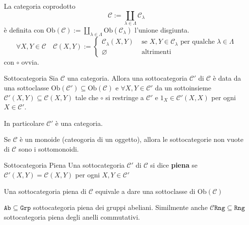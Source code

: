 \begin{example}
    La categoria coprodotto
    \[
      \mathcal{C} := \coprod_{\lambda \in \Lambda} \mathcal{C}_{\lambda} 
    \]
    è definita con \(\mathrm{Ob}{(\mathcal{C})} := \coprod_{\lambda \in \Lambda} \mathrm{Ob}{(\mathcal{C}_{\lambda} )}\) l'unione disgiunta. 
    \[
      \forall X, Y \in \mathcal{C} \quad \mathcal{C}{(X, Y)} := \begin{cases}{}
          \mathcal{C}_{\lambda} {(X, Y)} & \text{ se } X, Y \in \mathcal{C}_{\lambda} \text{ per
          qualche } \lambda \in \Lambda \\
              \varnothing & \text{ altrimenti}
      \end{cases}
    \]
    con \(\circ\) ovvia.
\end{example}

\begin{definition}{Sottocategoria}
    Sia \(\mathcal{C}\) una categoria. Allora una sottocategoria \(\mathcal{C}'\) di \(\mathcal{C}\) è data
    da una sottoclasse \(\mathrm{Ob}{(\mathcal{C}')} \subseteq \mathrm{Ob}{(\mathcal{C})} \) e \(\forall X, Y \in \mathcal{C}'\) da un sottoinsieme \(\mathcal{C}'{(X, Y)} \subseteq \mathcal{C}{(X, Y)} \) tale che \(\circ\) si restringe a \(\mathcal{C}'\) e \(1_X \in \mathcal{C}'{(X, X)}\) per ogni \(X \in \mathcal{C}'\).

    In particolare \(\mathcal{C}'\) è una categoria.
\end{definition}

\begin{example}{}
    Se \(\mathcal{C}\) è un monoide (cateogoria di un oggetto), allora le sottocategorie
    non vuote di \(\mathcal{C}\) sono i sottomonoidi.
\end{example}

\begin{definition}{Sottocategoria Piena}
    Una sottocategoria \(\mathcal{C}'\) di \(\mathcal{C}\) si dice \textbf{piena} se \(\mathcal{C}'{(X, Y)} =
    \mathcal{C}{(X, Y)}\) per ogni \(X, Y \in \mathcal{C}'\) 
\end{definition}

\begin{remark}{}
    Una sottocategoria piena di \(\mathcal{C}\) equivale a dare una sottoclasse di \(\mathrm{Ob}{(\mathcal{C})}\) 
\end{remark}

\begin{example}
    \(\mathtt{Ab} \subseteq \mathtt{Grp} \) sottocategoria piena dei gruppi
    abeliani. Similmente anche \(\mathtt{\mathcal{C}Rng} \subseteq \mathtt{Rng} \)
    sottocategoria piena degli anelli commutativi.
\end{example}

